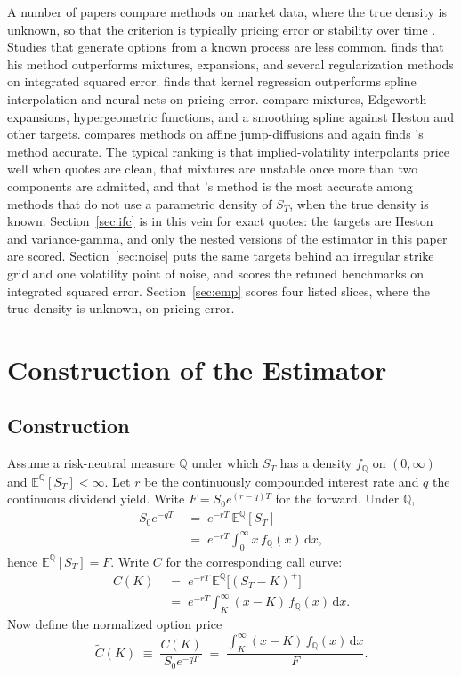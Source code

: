 \documentclass[preprint,12pt,authoryear,times]{elsarticle}
\newcommand{\E}{\mathbb{E}}
\newcommand{\Q}{\mathbb{Q}}
\begin{document}
A number of papers compare methods on market data, where the true density is unknown, so that the criterion is typically pricing error or stability over time \citep{cooper1999,jondeau2000,coutant2001,anagnou2005,bliss2002,liu2007}. Studies that generate options from a known process are less common. \citet{bondarenko2003} finds that his method outperforms mixtures, expansions, and several regularization methods on integrated squared error. \citet{lai2014} finds that kernel regression outperforms spline interpolation and neural nets on pricing error. \citet{santos2015} compare mixtures, Edgeworth expansions, hypergeometric functions, and a \citeauthor{bliss2002} smoothing spline against Heston and other targets. \citet{lu2019} compares methods on affine jump-diffusions and again finds \citeauthor{bondarenko2003}'s method accurate. The typical ranking is that implied-volatility interpolants price well when quotes are clean, that mixtures are unstable once more than two components are admitted, and that \citeauthor{bondarenko2003}'s method is the most accurate among methods that do not use a parametric density of \(S_T\), when the true density is known. Section~\ref{sec:ifc} is in this vein for exact quotes: the targets are Heston and variance-gamma, and only the nested versions of the estimator in this paper are scored. Section~\ref{sec:noise} puts the same targets behind an irregular strike grid and one volatility point of noise, and scores the retuned benchmarks on integrated squared error. Section~\ref{sec:emp} scores four listed slices, where the true density is unknown, on pricing error.

\section{Construction of the Estimator}
\label{sec:est}

\subsection{Construction}
\label{sec:construct}

Assume a risk-neutral measure \(\Q\) under which \(S_T\) has a density \(f_{\Q}\) on \((0,\infty)\) and \(\E^{\Q}[S_T]<\infty\). Let \(r\) be the continuously compounded interest rate and \(q\) the continuous dividend yield. Write \(F=S_0e^{(r-q)T}\) for the forward. Under \(\Q\),
\begin{align}
S_0e^{-qT}
&\;=\;
e^{-rT}\,\E^{\Q}[S_T]
\nonumber\\
&\;=\;
e^{-rT}\int_{0}^{\infty}x\,f_{\Q}(x)\,\mathrm{d}x,
\label{eq:S0}
\end{align}
hence \(\E^{\Q}[S_T]=F\). Write \(C\) for the corresponding call curve:
\begin{align}
C(K)
&\;=\;
e^{-rT}\,\E^{\Q}\bigl[(S_T-K)^+\bigr]
\nonumber\\
&\;=\;
e^{-rT}\int_K^{\infty}(x-K)\,f_{\Q}(x)\,\mathrm{d}x.
\label{eq:C}
\end{align}
Now define the normalized option price
\begin{equation}
\label{eq:Ctil}
\tilde C(K)
\;\equiv\;
\frac{C(K)}{S_0e^{-qT}}
\;=\;
\frac{\displaystyle\int_K^{\infty}(x-K)\,f_{\Q}(x)\,\mathrm{d}x}{F}.
\end{equation}
\end{document}
